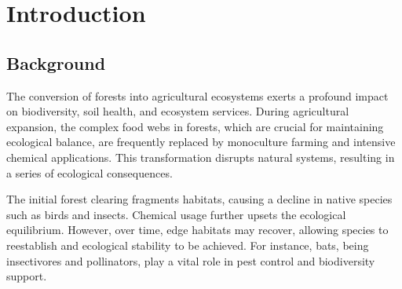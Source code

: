\documentclass[12pt]{article}  %
\begin{document}
\begin{abstract}
Additionally, to simulate real natural conditions, we developed the 
\textbf{FarmModel-V3$_{\alpha,\beta,\gamma}$} models, by introducing natural 
disasters such as drought, floods, and pest outbreaks to assess the 
stability of the ecosystem under natural shocks. The results indicate 
that the ecosystem could recover relatively quickly after natural 
disasters,improving its stability. And we conduct a \textbf{Monte Carlo 
simulation} for the growth rate of weed$(r_W0)$ and crop$(r_C0)$ to 
obtain the species distribution one year later. For model 1, we found 
a \textbf{“boundary line” ($\bold{r_W0 = 0.407r_C0 + 0.125}$)}.In the scenarios on 
either side of this line, the ecosystem is dominated by either weeds 
or crops.For model 3, we use the results to construct indicator of 
"output performance" and "risk".We use the indicators to describe model3's three stages as \textbf{(0.26, 0.27)}, \textbf{(0.79, 0.19)}, and \textbf{(0.54, 0.22)}. 
Ultimately, we conclude that the system without pesticides and with 
the introduction of bats have the best output performance and lowest 
risk.

    \vspace{5pt}
    \textbf{Keywords}:Lotka-Volterra Model\quad Organic Agriculture\quad Monte Carlo Simulation

\end{abstract}

\maketitle  %
\tableofcontents  %


\section{Introduction}
\subsection{Background}
The conversion of forests into agricultural ecosystems exerts a 
profound impact on biodiversity, soil health, and ecosystem 
services. During agricultural expansion, the complex food webs 
in forests, which are crucial for maintaining ecological balance, are frequently replaced by monoculture farming and intensive chemical applications. This transformation disrupts natural systems, resulting in a series of ecological consequences.

The initial forest clearing fragments habitats, causing a decline in native species such as birds and insects. Chemical usage further upsets the ecological equilibrium. However, over time, edge habitats may recover, allowing species to reestablish and ecological stability to be achieved. For instance, bats, being insectivores and pollinators, play a vital role in pest control and biodiversity support.
\end{document}
